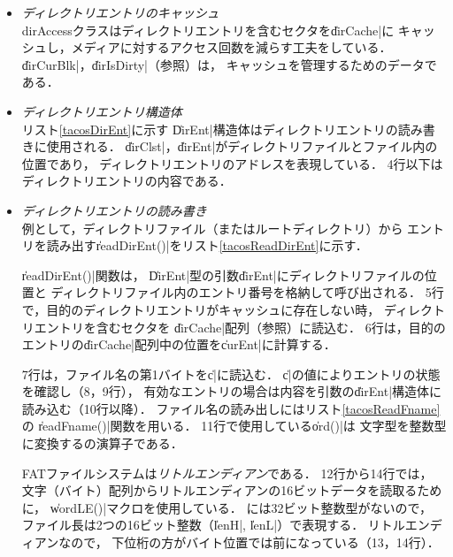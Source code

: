 \begin{itemize}
\item \emph{ディレクトリエントリのキャッシュ} \\
  dirAccessクラスはディレクトリエントリを含むセクタを\|dirCache|に
  キャッシュし，メディアに対するアクセス回数を減らす工夫をしている．
  \|dirCurBlk|，\|dirIsDirty|（参照）は，
  キャッシュを管理するためのデータである．

\item \emph{ディレクトリエントリ構造体} \\
  リスト\ref{tacosDirEnt}に示す
  \|DirEnt|構造体はディレクトリエントリの読み書きに使用される．
  \|dirClst|，\|dirEnt|がディレクトリファイルとファイル内の位置であり，
  ディレクトリエントリのアドレスを表現している．
  4行以下はディレクトリエントリの内容である．

  

\item \emph{ディレクトリエントリの読み書き} \\
  例として，ディレクトリファイル（またはルートディレクトリ）から
  エントリを読み出す\|readDirEnt()|をリスト\ref{tacosReadDirEnt}に示す．

  

  \|readDirEnt()|関数は，
  \|DirEnt|型の引数\|dirEnt|にディレクトリファイルの位置と
  ディレクトリファイル内のエントリ番号を格納して呼び出される．
  5行で，目的のディレクトリエントリがキャッシュに存在しない時，
  ディレクトリエントリを含むセクタを
  \|dirCache|配列（参照）に読込む．
  6行は，目的のエントリの\|dirCache|配列中の位置を\|curEnt|に計算する．

  7行は，ファイル名の第1バイトを\|c|に読込む．
  \|c|の値によりエントリの状態を確認し（8，9行），
  有効なエントリの場合は内容を引数の\|dirEnt|構造体に読み込む（10行以降）．
  ファイル名の読み出しにはリスト\ref{tacosReadFname}の
  \|readFname()|関数を用いる．
  11行で使用している\|ord()|は
  文字型を整数型に変換する{\cmml}の演算子である．

  FATファイルシステムは\emph{リトルエンディアン}である．
  12行から14行では，
  文字（バイト）配列からリトルエンディアンの16ビットデータを読取るために，
  \|wordLE()|マクロを使用している．
  {\cmml}には32ビット整数型がないので，
  ファイル長は2つの16ビット整数（\|lenH|, \|lenL|）で表現する．
  リトルエンディアンなので，
  下位桁の方がバイト位置では前になっている（13，14行）．
\end{itemize}

